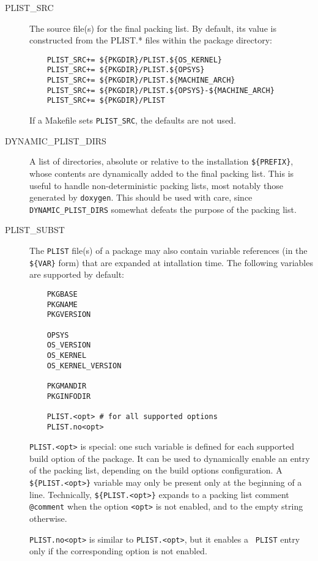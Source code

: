 \begin{description}

   \item[PLIST\_SRC]
   The source file(s) for the final packing list.  By default, its value
   is constructed from the PLIST.* files within the package directory:
\begin{verbatim}
    PLIST_SRC+=	${PKGDIR}/PLIST.${OS_KERNEL}
    PLIST_SRC+=	${PKGDIR}/PLIST.${OPSYS}
    PLIST_SRC+=	${PKGDIR}/PLIST.${MACHINE_ARCH}
    PLIST_SRC+=	${PKGDIR}/PLIST.${OPSYS}-${MACHINE_ARCH}
    PLIST_SRC+=	${PKGDIR}/PLIST
\end{verbatim}
   If a Makefile sets {\tt PLIST\_SRC}, the defaults are not used.

   \smallbreak
   \item[DYNAMIC\_PLIST\_DIRS]
   A list of directories, absolute or relative to the installation
   {\tt\$\{PREFIX\}}, whose contents are dynamically added to the final packing
   list. This is useful to handle non-deterministic packing lists, most notably
   those generated by {\tt doxygen}. This should be used with care, since {\tt
   DYNAMIC\_PLIST\_DIRS} somewhat defeats the purpose of the packing list.

   \smallbreak  \item[PLIST\_SUBST]
   The {\tt  PLIST} file(s) of a  package may also  contain variable references
   (in the  {\tt\$\{VAR\}} form)  that are expanded  at intallation  time.  The
   following variables are supported by default:
\begin{verbatim}
	PKGBASE
	PKGNAME
	PKGVERSION

	OPSYS
	OS_VERSION
	OS_KERNEL
	OS_KERNEL_VERSION

	PKGMANDIR
	PKGINFODIR

	PLIST.<opt> # for all supported options
	PLIST.no<opt>
\end{verbatim}
   {\tt PLIST.<opt>} is special: one such variable is defined for each
   supported build option of the package. It can be used to dynamically enable
   an entry of the packing list, depending on the build options configuration.
   A {\tt\$\{PLIST.<opt>\}} variable may only be present only at the beginning
   of a line. Technically, {\tt\$\{PLIST.<opt>\}} expands to a packing list
   comment {\tt @comment} when the option {\tt <opt>} is not enabled, and to
   the empty string otherwise.

   {\tt PLIST.no<opt>} is similar to {\tt PLIST.<opt>}, but it enables a {\tt
   PLIST} entry only if the corresponding option is not enabled.


\end{description}
